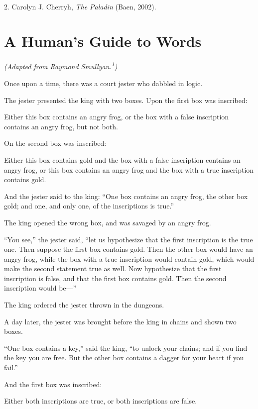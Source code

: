 {
 2. Carolyn J. Cherryh, \textit{The Paladin} (Baen, 2002).}

\chapter{A Human's Guide to Words}


{
 \textit{(Adapted from Raymond
Smullyan.}\textit{\textsuperscript{1}}\textit{)} }

{
 Once upon a time, there was a court jester who dabbled in logic.}

{
 The jester presented the king with two boxes. Upon the first box
was inscribed:}

{
 Either this box contains an angry frog, or the box with a false
inscription contains an angry frog, but not both.}

{
 On the second box was inscribed:}

{
 Either this box contains gold and the box with a false inscription
contains an angry frog, or this box contains an angry frog and the box
with a true inscription contains gold.}

{
 And the jester said to the king: ``One box
contains an angry frog, the other box gold; and one, and only one, of
the inscriptions is true.''}

{
 The king opened the wrong box, and was savaged by an angry frog.}

{
 ``You see,'' the jester said,
``let us hypothesize that the first inscription is the
true one. Then suppose the first box contains gold. Then the other box
would have an angry frog, while the box with a true inscription would
contain gold, which would make the second statement true as well. Now
hypothesize that the first inscription is false, and that the first box
contains gold. Then the second inscription would
be---''}

{
 The king ordered the jester thrown in the dungeons.}

{
 A day later, the jester was brought before the king in chains and
shown two boxes.}

{
 ``One box contains a key,''
said the king, ``to unlock your chains; and if you
find the key you are free. But the other box contains a dagger for your
heart if you fail.''}

{
 And the first box was inscribed:}

{
 Either both inscriptions are true, or both inscriptions are
false.}

